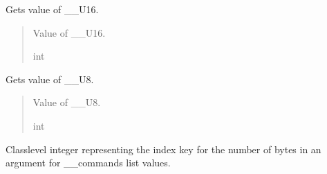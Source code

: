 \documentclass[letterpaper,10pt,english]{sphinxmanual}
\begin{document}
\begin{fulllineitems}

\begin{fulllineitems}
\label{\detokenize{PodCommands:PodCommands.POD_Commands.U16}}
\pysigstartsignatures
{}
\pysigstopsignatures
\sphinxAtStartPar
Gets value of \_\_U16.
\begin{quote}\begin{description}
\sphinxAtStartPar
Value of \_\_U16.

\sphinxAtStartPar
int

\end{description}\end{quote}

\end{fulllineitems}


\begin{fulllineitems}
\label{\detokenize{PodCommands:PodCommands.POD_Commands.U8}}
\pysigstartsignatures
{}
\pysigstopsignatures
\sphinxAtStartPar
Gets value of \_\_U8.
\begin{quote}\begin{description}
\sphinxAtStartPar
Value of \_\_U8.

\sphinxAtStartPar
int

\end{description}\end{quote}

\end{fulllineitems}


\begin{fulllineitems}
\label{\detokenize{PodCommands:PodCommands.POD_Commands.__ARGUMENTS}}
\pysigstartsignatures
{}
\pysigstopsignatures
\sphinxAtStartPar
Class\sphinxhyphen{}level integer representing the index key for the number of bytes in an     argument for \_\_commands list values.


\end{fulllineitems}
\end{fulllineitems}
\end{document}
